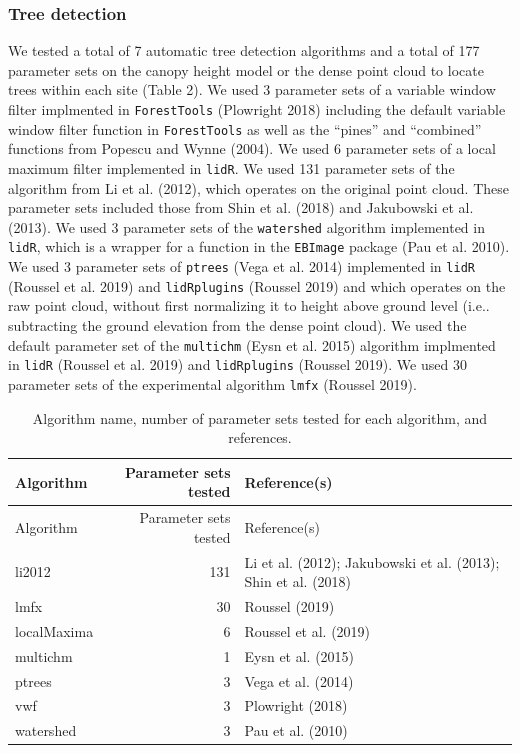 \documentclass[]{article}
\begin{document}
\subsubsection{Tree detection}\label{tree-detection}

We tested a total of 7 automatic tree detection algorithms and a total
of 177 parameter sets on the canopy height model or the dense point
cloud to locate trees within each site (Table 2). We used 3 parameter
sets of a variable window filter implmented in \texttt{ForestTools}
(Plowright 2018) including the default variable window filter function
in \texttt{ForestTools} as well as the ``pines'' and ``combined''
functions from Popescu and Wynne (2004). We used 6 parameter sets of a
local maximum filter implemented in \texttt{lidR}. We used 131 parameter
sets of the algorithm from Li et al. (2012), which operates on the
original point cloud. These parameter sets included those from Shin et
al. (2018) and Jakubowski et al. (2013). We used 3 parameter sets of the
\texttt{watershed} algorithm implemented in \texttt{lidR}, which is a
wrapper for a function in the \texttt{EBImage} package (Pau et al.
2010). We used 3 parameter sets of \texttt{ptrees} (Vega et al. 2014)
implemented in \texttt{lidR} (Roussel et al. 2019) and
\texttt{lidRplugins} (Roussel 2019) and which operates on the raw point
cloud, without first normalizing it to height above ground level (i.e..
subtracting the ground elevation from the dense point cloud). We used
the default parameter set of the \texttt{multichm} (Eysn et al. 2015)
algorithm implmented in \texttt{lidR} (Roussel et al. 2019) and
\texttt{lidRplugins} (Roussel 2019). We used 30 parameter sets of the
experimental algorithm \texttt{lmfx} (Roussel 2019).

\begin{longtable}[]{@{}lrl@{}}
\caption{Algorithm name, number of parameter sets tested for each
algorithm, and references.}\tabularnewline
\toprule
Algorithm & Parameter sets tested & Reference(s)\tabularnewline
\midrule
\endfirsthead
\toprule
Algorithm & Parameter sets tested & Reference(s)\tabularnewline
\midrule
\endhead
li2012 & 131 & Li et al. (2012); Jakubowski et al. (2013); Shin et al.
(2018)\tabularnewline
lmfx & 30 & Roussel (2019)\tabularnewline
localMaxima & 6 & Roussel et al. (2019)\tabularnewline
multichm & 1 & Eysn et al. (2015)\tabularnewline
ptrees & 3 & Vega et al. (2014)\tabularnewline
vwf & 3 & Plowright (2018)\tabularnewline
watershed & 3 & Pau et al. (2010)\tabularnewline
\bottomrule
\end{longtable}
\end{document}
